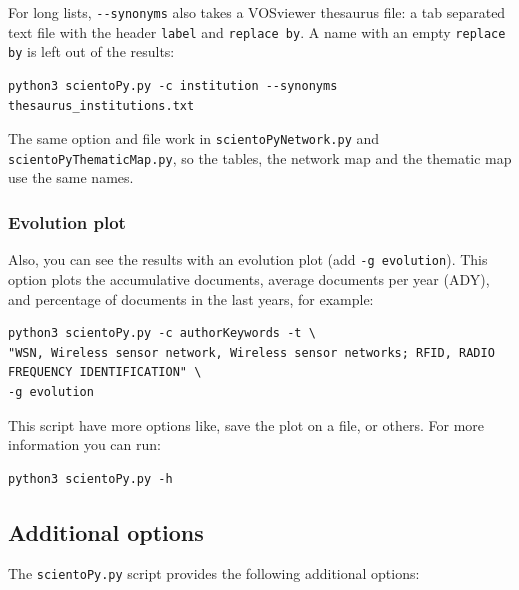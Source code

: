 \documentclass[10pt,letterpaper]{article}
\begin{document}
For long lists, \verb|--synonyms| also takes a VOSviewer thesaurus file: a tab separated text file with the header \verb|label| and \verb|replace by|. A name with an empty \verb|replace by| is left out of the results:

\begin{verbatim}
python3 scientoPy.py -c institution --synonyms thesaurus_institutions.txt
\end{verbatim}

The same option and file work in \verb|scientoPyNetwork.py| and \verb|scientoPyThematicMap.py|, so the tables, the network map and the thematic map use the same names.

\subsubsection{Evolution plot}

Also, you can see the results with an evolution plot (add \verb|-g evolution|). This option plots the accumulative documents, average documents per year (ADY), and percentage of documents in the last years, for example:

\begin{verbatim}
python3 scientoPy.py -c authorKeywords -t \
"WSN, Wireless sensor network, Wireless sensor networks; RFID, RADIO FREQUENCY IDENTIFICATION" \
-g evolution
\end{verbatim}

This script have more options like, save the plot on a file, or others. For more information you can run:

\begin{verbatim}
python3 scientoPy.py -h
\end{verbatim}

\subsection{Additional options}

The \verb|scientoPy.py| script provides the following additional options:
\end{document}

